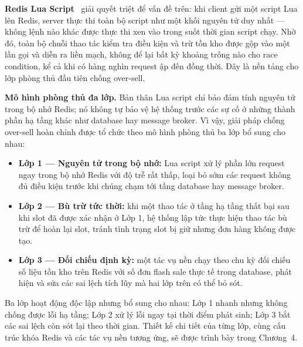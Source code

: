 \documentclass[../DoAn.tex]{subfiles}
\begin{document}
\textbf{Redis Lua Script}~\cite{redis_docs} giải quyết triệt để vấn đề trên: khi client gửi
một script Lua lên Redis, server thực thi toàn bộ script như một khối nguyên tử duy nhất ---
không lệnh nào khác được thực thi xen vào trong suốt thời gian script chạy. Nhờ đó, toàn bộ
chuỗi thao tác kiểm tra điều kiện và trừ tồn kho được gộp vào một lần gọi và diễn ra liền
mạch, không để lại bất kỳ khoảng trống nào cho race condition, kể cả khi có hàng nghìn
request ập đến đồng thời. Đây là nền tảng cho lớp phòng thủ đầu tiên chống over-sell.

\textbf{Mô hình phòng thủ đa lớp.} Bản thân Lua script chỉ bảo đảm tính nguyên tử trong bộ
nhớ Redis; nó không tự bảo vệ hệ thống trước các sự cố ở những thành phần hạ tầng khác như
database hay message broker. Vì vậy, giải pháp chống over-sell hoàn chỉnh được tổ chức theo
mô hình phòng thủ ba lớp bổ sung cho nhau:

\begin{itemize}[noitemsep]
    \item \textbf{Lớp 1 --- Nguyên tử trong bộ nhớ:} Lua script xử lý phần lớn request ngay
    trong bộ nhớ Redis với độ trễ rất thấp, loại bỏ sớm các request không đủ điều kiện trước
    khi chúng chạm tới tầng database hay message broker.
    \item \textbf{Lớp 2 --- Bù trừ tức thời:} khi một thao tác ở tầng hạ tầng thất bại sau
    khi slot đã được xác nhận ở Lớp 1, hệ thống lập tức thực hiện thao tác bù trừ để hoàn lại
    slot, tránh tình trạng slot bị giữ nhưng đơn hàng không được tạo.
    \item \textbf{Lớp 3 --- Đối chiếu định kỳ:} một tác vụ nền chạy theo chu kỳ đối chiếu số
    liệu tồn kho trên Redis với số đơn flash sale thực tế trong database, phát hiện và sửa
    các sai lệch tích lũy mà hai lớp trên có thể bỏ sót.
\end{itemize}

Ba lớp hoạt động độc lập nhưng bổ sung cho nhau: Lớp 1 nhanh nhưng không chống được lỗi hạ
tầng; Lớp 2 xử lý lỗi ngay tại thời điểm phát sinh; Lớp 3 bắt các sai lệch còn sót lại theo
thời gian. Thiết kế chi tiết của từng lớp, cùng cấu trúc khóa Redis và các tác vụ nền tương
ứng, sẽ được trình bày trong Chương~4.
\end{document}
